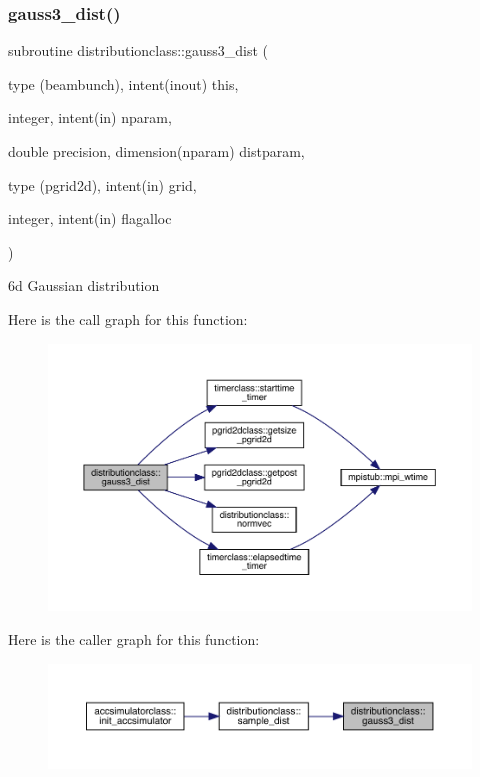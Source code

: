 \subsubsection{\texorpdfstring{gauss3\_dist()}{gauss3\_dist()}}
{\footnotesize\ttfamily subroutine distributionclass\+::gauss3\+\_\+dist (\begin{DoxyParamCaption}\item[{type (beambunch), intent(inout)}]{this,  }\item[{integer, intent(in)}]{nparam,  }\item[{double precision, dimension(nparam)}]{distparam,  }\item[{type (pgrid2d), intent(in)}]{grid,  }\item[{integer, intent(in)}]{flagalloc }\end{DoxyParamCaption})}



6d Gaussian distribution 

Here is the call graph for this function\+:\nopagebreak
\begin{figure}[H]
\begin{center}
\leavevmode
\includegraphics[width=350pt]{namespacedistributionclass_af85f956a3fdb677022a546bc69ecfb3c_cgraph}
\end{center}
\end{figure}
Here is the caller graph for this function\+:\nopagebreak
\begin{figure}[H]
\begin{center}
\leavevmode
\includegraphics[width=350pt]{namespacedistributionclass_af85f956a3fdb677022a546bc69ecfb3c_icgraph}
\end{center}
\end{figure}
\mbox{\label{namespacedistributionclass_a2e96d2c85cac39531d37f2ce057c5766}} 
